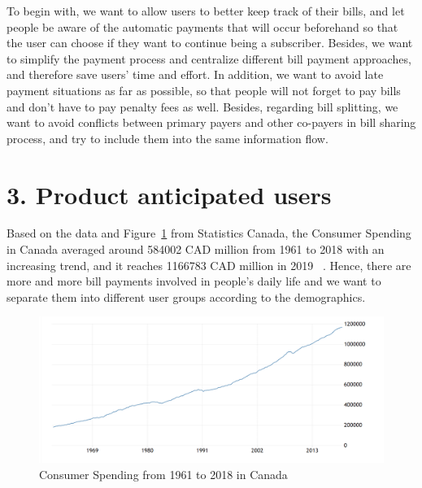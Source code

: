 \documentclass{sigchi}
\begin{document}
To begin with, we want to allow users to better keep track of their bills, and let people be aware of the automatic payments that will occur beforehand so that the user can choose if they want to continue being a subscriber. Besides, we want to simplify the payment process and centralize different bill payment approaches, and therefore save users' time and effort. In addition, we want to avoid late payment situations as far as possible, so that people will not forget to pay bills and don't have to pay penalty fees as well. Besides, regarding bill splitting, we want to avoid conflicts between primary payers and other co-payers in bill sharing process, and try to include them into the same information flow. 

\section{3. Product anticipated users}

Based on the data and Figure~\ref{fig:figure1} from Statistics Canada, the Consumer Spending in Canada averaged around 584002 CAD million from 1961 to 2018 with an increasing trend, and it reaches 1166783 CAD million in 2019 ~\cite{DCCS}. Hence, there are more and more bill payments involved in people's daily life and we want to separate them into different user groups according to the demographics.

\begin{figure}[h!]
\centering
  \includegraphics[width=0.9\columnwidth]{consumer-spending.png}
  \caption{Consumer Spending from 1961 to 2018 in Canada}
  \label{fig:figure1}
\end{figure}
\end{document}
